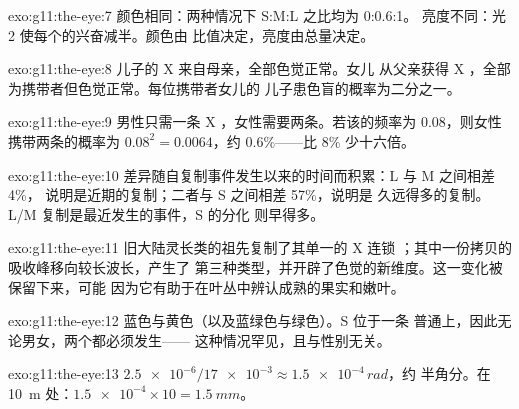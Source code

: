 \begin{solution}{exo:g11:the-eye:7}
颜色相同：两种情况下 S:M:L 之比均为 0:0.6:1。
亮度不同：光 2 使每个的兴奋减半。颜色由
比值决定，亮度由总量决定。
\end{solution}

\begin{solution}{exo:g11:the-eye:8}
儿子的 X 来自母亲，全部色觉正常。女儿
从父亲获得 X ，全部为携带者但色觉正常。每位携带者女儿的
儿子患色盲的概率为二分之一。
\end{solution}

\begin{solution}{exo:g11:the-eye:9}
男性只需一条 X ，女性需要两条。若该的频率为
0.08，则女性携带两条的概率为 $0.08^2 = 0.0064$，约
0.6\%——比 8\% 少十六倍。
\end{solution}

\begin{solution}{exo:g11:the-eye:10}
差异随自复制事件发生以来的时间而积累：L 与 M 之间相差 4\%，
说明是近期的复制；二者与 S 之间相差 57\%，说明是
久远得多的复制。L/M 复制是最近发生的事件，S 的分化
则早得多。
\end{solution}

\begin{solution}{exo:g11:the-eye:11}
旧大陆灵长类的祖先复制了其单一的 X 连锁
；其中一份拷贝的吸收峰移向较长波长，产生了
第三种类型，并开辟了色觉的新维度。这一变化被保留下来，可能
因为它有助于在叶丛中辨认成熟的果实和嫩叶。
\end{solution}

\begin{solution}{exo:g11:the-eye:12}
蓝色与黄色（以及蓝绿色与绿色）。S 位于一条
普通上，因此无论男女，两个都必须发生——
这种情况罕见，且与性别无关。
\end{solution}

\begin{solution}{exo:g11:the-eye:13}
$\num{2.5e-6}/\num{17e-3} \approx \num{1.5e-4}\,\unit{rad}$，约
半角分。在 \qty{10}{m} 处：$\num{1.5e-4} \times 10 =
\qty{1.5}{mm}$。
\end{solution}

